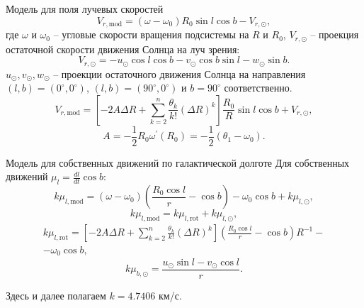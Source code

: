 \documentclass[compress]{beamer}
\begin{document}
\begin{frame}{Модель для поля лучевых скоростей}
\begin{equation}
        V_{r, \mathrm{mod}} = (\omega - \omega_0) R_0 \sin{l} \cos{b} - V_{r, \odot},
\end{equation}
где $\omega$ и $\omega_0$ -- угловые скорости вращения подсистемы на $R$ и $R_0$,  $V_{r, \odot}$ -- проекция остаточной скорости движения Солнца на луч зрения:
\begin{equation}
        V_{r, \odot} = -u_{\odot} \cos{l} \cos{b} - v_{\odot} \cos{b} \sin{l} - w_{\odot} \sin{b}.
\end{equation}
$u_{\odot}, v_{\odot}, w_{\odot}$ -- проекции остаточного движения Солнца на направления $(l, b) = (0^{\circ}, 0^{\circ})$, $(l, b) = (90^{\circ}, 0^{\circ})$ и $b = 90^{\circ}$ соот\-ветст\-вен\-но.
	\begin{equation}
		V_{r, \mathrm{mod}} = \left[ -2A\Delta R + \sum^n_{k = 2} \frac{\theta_k}{k!} \left( \Delta R \right)^k \right] \frac{R_0}{R} \sin{l} \cos{b} + V_{r, \odot},
	\end{equation}
	\begin{equation}
		A = - \frac{1}{2} R_0 \omega^{'}(R_0) = - \frac{1}{2} (\theta_1 - \omega_0).
	\end{equation}
\end{frame}

\begin{frame}{Модель для собственных движений по галактической долготе}
Для собственных движений $\mu_l = \frac{dl}{dt}\cos{b}$:
\begin{equation}
        k\mu_{l, \mathrm{mod}} = (\omega - \omega_0) \left( \frac{R_0\cos{l}}{r} - \cos{b} \right) - \omega_0 \cos{b} + k\mu_{l, \odot},
\end{equation}
	\begin{equation}
		k\mu_{l, \mathrm{mod}} = k\mu_{l, \mathrm{rot}} + k\mu_{l, \odot},
	\end{equation}
	\begin{multline}
                k\mu_{l, \mathrm{rot}} = \left[ -2A\Delta R + \sum^n_{k = 2} \frac{\theta_k}{k!} \left( \Delta R \right)^k \right] \left( \frac{R_0\cos{l}}{r} - \cos{b} \right) R^{-1} -\\
                -\omega_0 \cos{b},
	\end{multline}
	\begin{equation}
                k\mu_{b, \odot} = \frac{u_{\odot}\sin{l}- v_{\odot}\cos{l}}{r}.
	\end{equation}

        Здесь и далее полагаем $k=4.7406$ км/с.
\end{frame}
\end{document}
